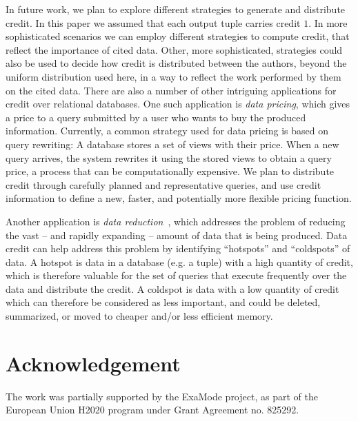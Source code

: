 \documentclass[preprint,12pt,sort&compress]{elsarticle}
\newcommand{\scream}[1]{{\bf * #1 *}{\typeout{#1}}}
\begin{document}
In future work, we plan to explore different strategies to generate and distribute credit. In this paper we assumed that each output tuple carries credit $1$. In more sophisticated scenarios we can employ different strategies to compute credit, that reflect the importance of cited data.
Other, more sophisticated, strategies could also be used to decide how credit is distributed between the authors, beyond the uniform distribution used here, in a way to reflect the work performed by them on the cited data.  
There are also a number of other intriguing applications for credit over relational databases.
One such application is \emph{data pricing}, which gives a price to a query submitted by a user who wants to buy the produced information. Currently, a common strategy used for data pricing is based on query rewriting:  A database stores a set of views with their price. When a new query arrives, the system rewrites it using the stored views to obtain a query price, a process that can be computationally expensive.
We plan to distribute credit through carefully planned and representative queries, and use credit information to define a new, faster, and potentially more flexible pricing function.

Another application is \emph{data reduction}~\cite{milo2019getting}, which addresses the problem of reducing the vast -- and rapidly expanding -- amount of data that is being produced. %
Data credit can help address this problem by identifying ``hotspots'' and ``coldspots'' of data. A hotspot is data in a database (e.g. a tuple) with a high quantity of credit, which is therefore valuable for the set of queries that execute frequently over the data and distribute the credit. 
A coldspot is data with a low quantity of credit which can therefore be considered as less  important, and could be deleted, summarized, or moved to cheaper and/or less efficient memory. 



\section*{Acknowledgement}
The work was partially supported by the ExaMode project, as part of the European Union H2020 program under Grant Agreement no. 825292. 
\end{document}
